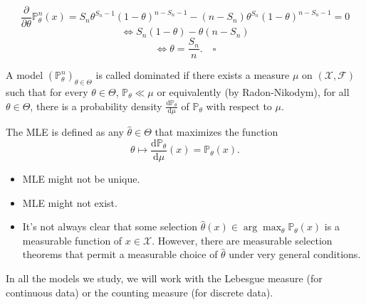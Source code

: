 \documentclass[open=any, 11pt,paper=A4]{scrreprt}
\begin{document}
\[
    \frac{\partial}{\partial \theta} \mathbb{P}_\theta^n(x) = S_n \theta^{S_n-1} (1-\theta)^{n-S_n-1} - (n-S_n)\theta^{S_n} (1-\theta)^{n-S_n-1} = 0
\]
\[
    \Leftrightarrow S_n (1 - \theta) - \theta (n - S_n)
\]
\[
    \Leftrightarrow \theta = \frac{S_n}{n}.
    \quad \square
\]

\begin{definition}\label{def:dominatedmodel}
A model $(\mathbb{P}_\theta^n)_{\theta \in \Theta}$ is called dominated if there exists a measure $\mu$ on $(\mathcal{X}, \mathcal{F})$ such that for every $\theta \in \Theta$, $\mathbb{P}_\theta \ll \mu$ or equivalently (by Radon-Nikodym), for all $\theta \in \Theta$, there is a probability density $\frac{\mathrm{d} \mathbb{P}_\theta}{\mathrm{d}\mu}$ of $\mathbb{P}_\theta$ with respect to $\mu$.

The MLE is defined as any $\hat{\theta} \in \Theta$ that maximizes the function
\[
    \theta \mapsto \frac{\mathrm{d} \mathbb{P}_\theta}{\mathrm{d}\mu}(x) = \mathbb{P}_\theta(x).
\]
\end{definition}

\begin{remark}[Caveats]\label{rem:caveats}
\begin{itemize}
    \item MLE might not be unique.
    \item MLE might not exist.
    \item It's not always clear that some selection $\hat{\theta}(x) \in \arg \max_{\theta} \mathbb{P}_\theta(x)$ is a measurable function of $x \in \mathcal{X}$. However, there are measurable selection theorems that permit a measurable choice of $\hat{\theta}$ under very general conditions.
\end{itemize}
\end{remark}

\begin{remark}\label{rem:mu}
In all the models we study, we will work with the Lebesgue measure (for continuous data) or the counting measure (for discrete data).
\end{remark}
\end{document}
